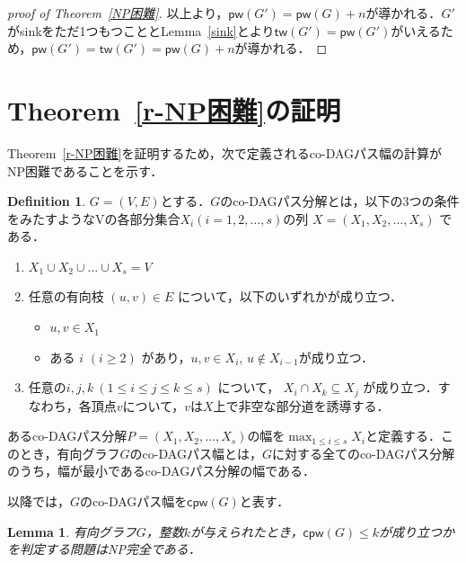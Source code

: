 \documentclass[master]{kuisthesis}		%
\theoremstyle{plain}
\newtheorem{lemma}{Lemma}
\theoremstyle{definition}
\newtheorem{definition*}{Definition}
\begin{document}
{\begin{proof}[proof of Theorem~\ref{NP困難}]
    以上より，$\mathsf{pw}(G') = \mathsf{pw}(G) + n$が導かれる．$G'$がsinkをただ1つもつこととLemma~\ref{sink}とより$\mathsf{tw}(G') = \mathsf{pw}(G')$がいえるため，$\mathsf{pw}(G') = \mathsf{tw}(G') = \mathsf{pw}(G) + n$が導かれる．
    
\end{proof}








\section{Theorem~\ref{r-NP困難}の証明}

Theorem~\ref{r-NP困難}を証明するため，次で定義されるco-DAGパス幅の計算がNP困難であることを示す．

\begin{definition*}
     $G=(V, E)$とする．$G$のco-DAGパス分解とは，以下の3つの条件をみたすようなVの各部分集合$ X_i (i = 1, 2,  \ldots, s)$の列 $X=(X_1, X_2,  \ldots, X_s)$ である．

    \begin{enumerate}
        \item $ X_1 \cup X_2 \cup \dots \cup X_s = V $ 
        \item 任意の有向枝 $ (u, v) \in E $ について，以下のいずれかが成り立つ．
        \begin{itemize}
            \item $u, v \in X_1$
        \item ある $i$ $(i \geq 2)$ があり，$u, v \in X_i$, $u \notin X_{i-1}$が成り立つ．
        \end{itemize}
        \item 任意の$ i, j, k\ (1 \leq i \leq j \leq k \leq s)$ について， $X_i \cap X_k \subseteq X_j$ が成り立つ．すなわち，各頂点$v$について，$v$は$X$上で非空な部分道を誘導する．
    \end{enumerate}
    あるco-DAGパス分解$P = (X_1, X_2,   \ldots, X_s)$の幅を$\max_{1 \leq i \leq s} {X_i}$と定義する．このとき，有向グラフ$G$のco-DAGパス幅とは，$G$に対する全てのco-DAGパス分解のうち，幅が最小であるco-DAGパス分解の幅である．
    
\end{definition*}
 
以降では，$G$のco-DAGパス幅を$\mathsf{cpw}(G)$と表す．





\begin{lemma}\label{co-DAGパス分解}
    有向グラフ$G$，整数$k$が与えられたとき，$\mathsf{cpw}(G) \leq k$が成り立つかを判定する問題はNP完全である．
\end{lemma}

}
\end{document}
